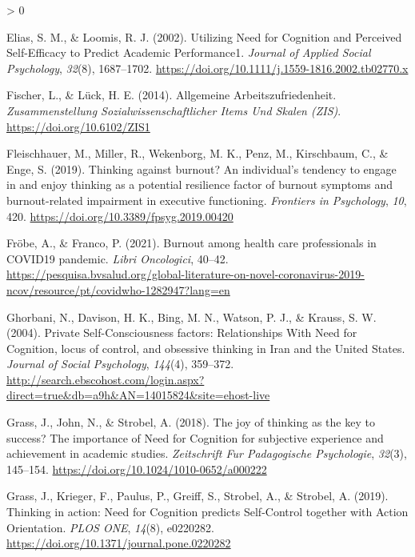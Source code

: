 \documentclass[
  english,
  man]{apa6}
\newlength{\cslhangindent}
\newenvironment{CSLReferences}[2] %
 {%
  \setlength{\parindent}{0pt}
  \ifodd #1 \everypar{\setlength{\hangindent}{\cslhangindent}}\ignorespaces\fi
  \ifnum #2 > 0
  \setlength{\parskip}{#2\baselineskip}
  \fi
 }%
 {}
\begin{document}
\begin{CSLReferences}{1}{0}
\leavevmode\hypertarget{ref-Elias2002}{}%
Elias, S. M., \& Loomis, R. J. (2002). Utilizing {Need} for {Cognition} and {Perceived} {Self}-{Efficacy} to {Predict} {Academic} {Performance1}. \emph{Journal of Applied Social Psychology}, \emph{32}(8), 1687--1702. \url{https://doi.org/10.1111/j.1559-1816.2002.tb02770.x}

\leavevmode\hypertarget{ref-Fischer2014}{}%
Fischer, L., \& Lück, H. E. (2014). Allgemeine {Arbeitszufriedenheit}. \emph{Zusammenstellung Sozialwissenschaftlicher Items Und Skalen (ZIS)}. \url{https://doi.org/10.6102/ZIS1}

\leavevmode\hypertarget{ref-Fleischhauer2019}{}%
Fleischhauer, M., Miller, R., Wekenborg, M. K., Penz, M., Kirschbaum, C., \& Enge, S. (2019). Thinking against burnout? {An} individual's tendency to engage in and enjoy thinking as a potential resilience factor of burnout symptoms and burnout-related impairment in executive functioning. \emph{Frontiers in Psychology}, \emph{10}, 420. \url{https://doi.org/10.3389/fpsyg.2019.00420}

\leavevmode\hypertarget{ref-Froebe2021}{}%
Fröbe, A., \& Franco, P. (2021). Burnout among health care professionals in {COVID19} pandemic. \emph{Libri Oncologici}, 40--42. \url{https://pesquisa.bvsalud.org/global-literature-on-novel-coronavirus-2019-ncov/resource/pt/covidwho-1282947?lang=en}

\leavevmode\hypertarget{ref-Ghorbani2004}{}%
Ghorbani, N., Davison, H. K., Bing, M. N., Watson, P. J., \& Krauss, S. W. (2004). Private {Self}-{Consciousness} factors: {Relationships} {With} {Need} for {Cognition}, locus of control, and obsessive thinking in {Iran} and the {United} {States}. \emph{Journal of Social Psychology}, \emph{144}(4), 359--372. \url{http://search.ebscohost.com/login.aspx?direct=true\&db=a9h\&AN=14015824\&site=ehost-live}

\leavevmode\hypertarget{ref-Grass2018}{}%
Grass, J., John, N., \& Strobel, A. (2018). The joy of thinking as the key to success? {The} importance of {Need} for {Cognition} for subjective experience and achievement in academic studies. \emph{Zeitschrift Fur Padagogische Psychologie}, \emph{32}(3), 145--154. \url{https://doi.org/10.1024/1010-0652/a000222}

\leavevmode\hypertarget{ref-Grass2019}{}%
Grass, J., Krieger, F., Paulus, P., Greiff, S., Strobel, A., \& Strobel, A. (2019). Thinking in action: {Need} for {Cognition} predicts {Self}-{Control} together with {Action} {Orientation}. \emph{PLOS ONE}, \emph{14}(8), e0220282. \url{https://doi.org/10.1371/journal.pone.0220282}


\end{CSLReferences}
\end{document}
